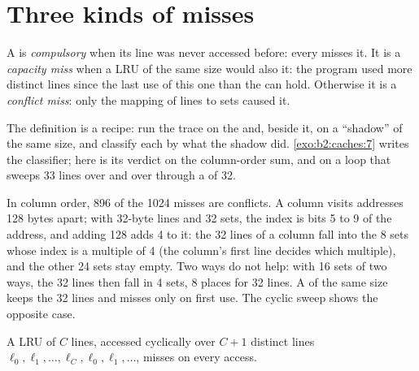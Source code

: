 \section{Three kinds of misses}\label{sec:b2:caches:three-c}

\begin{definition}\label{def:b2:caches:three-c}
A  is \emph{compulsory} when its line was never accessed before: every  misses it.
It is a \emph{capacity miss} when a  LRU  of the same size would also
 it: the program used more distinct lines since the last use of this one than the  can hold. Otherwise it
is a \emph{conflict miss}: only the mapping of lines to sets caused it.
\end{definition}

The definition is a recipe: run the trace on the  and, beside it, on a  ``shadow''  of the
same size, and classify each  by what the shadow did. \cref{exo:b2:caches:7} writes the classifier; here is its
verdict on the column-order sum, and on a loop that sweeps 33 lines over and over through a  of 32.

\label{out:b2:caches:three-c}

In column order, 896 of the 1024 misses are conflicts. A column visits addresses 128 bytes apart; with 32-byte lines
and 32 sets, the index is bits 5 to 9 of the address, and adding 128 adds 4 to it: the 32 lines of a column fall into
the 8 sets whose index is a multiple of 4 (the column's first line decides which multiple), and the other 24 sets
stay empty. Two ways do not help: with 16 sets of two ways, the 32 lines then fall in 4 sets, 8 places for 32 lines. A  of the same
size keeps the 32 lines and misses only on first use. The cyclic sweep shows the opposite case.

\begin{proposition}\label{prop:b2:caches:cyclic}
A  LRU  of $C$ lines, accessed cyclically over $C + 1$ distinct lines $\ell_0, \ell_1,
\dots, \ell_C, \ell_0, \ell_1, \dots$, misses on every access.
\end{proposition}

